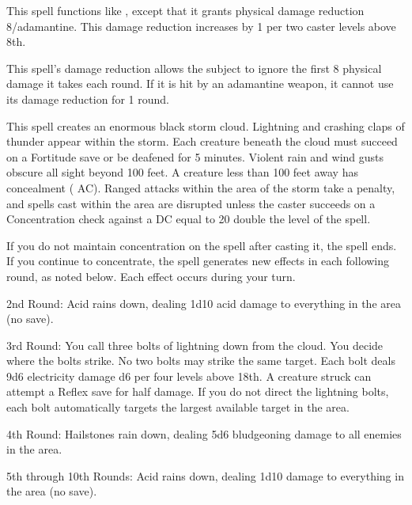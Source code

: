 \begin{spelleffect}
  This spell functions like , except that it grants physical damage reduction 8/adamantine. This damage reduction increases by 1 per two caster levels above 8th.
\end{spelleffect}
\begin{spellnotes}
  This spell's damage reduction allows the subject to ignore the first 8 physical damage it takes each round. If it is hit by an adamantine weapon, it cannot use its damage reduction for 1 round.
\end{spellnotes}

\spellrng{\rngfar}
\begin{spelleffect}
  This spell creates an enormous black storm cloud. Lightning and crashing claps of thunder appear within the storm. Each creature beneath the cloud must succeed on a Fortitude save or be deafened for 5 minutes. Violent rain and wind gusts obscure all sight beyond 100 feet. A creature less than 100 feet away has concealment ( AC). Ranged attacks within the area of the storm take a  penalty, and spells cast within the area are disrupted unless the caster succeeds on a Concentration check against a DC equal to 20 \add double the level of the spell.
  \par If you do not maintain concentration on the spell after casting it, the spell ends. If you continue to concentrate, the spell generates new effects in each following round, as noted below. Each effect occurs during your turn.
  \par 2nd Round: Acid rains down, dealing 1d10 acid damage to everything in the area (no save).
  \par 3rd Round: You call three bolts of lightning down from the cloud. You decide where the bolts strike. No two bolts may strike the same target. Each bolt deals 9d6 electricity damage \add d6 per four levels above 18th. A creature struck can attempt a Reflex save for half damage. If you do not direct the lightning bolts, each bolt automatically targets the largest available target in the area.
  \par 4th Round: Hailstones rain down, dealing 5d6 bludgeoning damage to all enemies in the area.
  \par 5th through 10th Rounds: Acid rains down, dealing 1d10 damage to everything in the area (no save).
\end{spelleffect}

